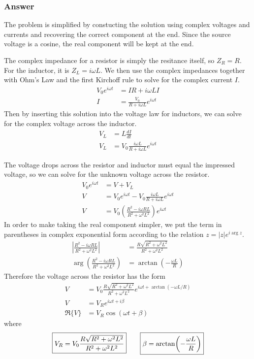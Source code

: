 \subsubsection{Answer}

The problem is simplified by constucting the solution using complex voltages
and currents and recovering the correct component at the end. Since the
source voltage is a cosine, the real component will be kept at the end.

The complex impedance for a resistor is simply the resitance itself, so $Z_R
= R$. For the inductor, it is $Z_L = i{\omega} L$. We then use the complex
impedances together with Ohm's Law and the first Kirchoff rule to solve for
the complex current $I$.
\begin{align*}
    V_0e^{i{\omega} t} &= IR + i{\omega} LI \\
    I &= \frac{V_0}{R+i{\omega} L} e^{i{\omega} t}
\end{align*}
Then by inserting this solution into the voltage law for inductors, we can
solve for the complex voltage across the inductor.
\begin{align*}
    V_L &= L\frac{dI}{dt} \\
    V_L &= V_0 \frac{i{\omega} L}{R+i{\omega} L} e^{i{\omega} t}
\end{align*}

The voltage drops across the resistor and inductor must equal the impressed
voltage, so we can solve for the unknown voltage across the resistor.
\begin{align*}
    V_0e^{i{\omega} t} &= V + V_L \\
    V &= V_0e^{i{\omega} t} - V_0\frac{i{\omega} L}{R+i{\omega} L}e^{i{\omega} t} \\
    V &= V_0 (\frac{R^2 - i{\omega} RL}{R^2 + {\omega}^2L^2}) e^{i{\omega} t}
\end{align*}
In order to make taking the real component simpler, we put the term in
parentheses in complex exponential form according to the relation $z =
|z|e^{i \arg z}$.
\begin{align*}
    \left| \frac{R^2 - i{\omega} RL}{R^2 + {\omega}^2L^2} \right| &=
	\frac{R\sqrt{R^2 + {\omega}^2L^2}}{R^2 + {\omega}^2L^2}
    \\
    \arg (\frac{R^2 - i{\omega} RL}{R^2 + {\omega}^2L^2}) &= \arctan(-\frac{{\omega} L}{R})
\end{align*}
Therefore the voltage across the resistor has the form
\begin{align*}
    V &= V_0 \frac{R\sqrt{R^2 + {\omega}^2L^2}}{R^2 + {\omega}^2L^2} e^{i{\omega} t + \arctan(-{\omega} L/R)} \\
    V &= V_R e^{i{\omega} t + i\beta} \\
    \Re\{V\} &= V_R \cos({\omega} t + \beta)
\end{align*}
where
\begin{align}
    \boxed{ V_R = V_0 \frac{R\sqrt{R^2 + {\omega}^2L^2}}{R^2 + {\omega}^2L^2} }
    \quad\quad
    \boxed{ \beta = \arctan(-\frac{{\omega} L}{R}) \vphantom{\frac{\sqrt{R}}{R}} }
\end{align}

